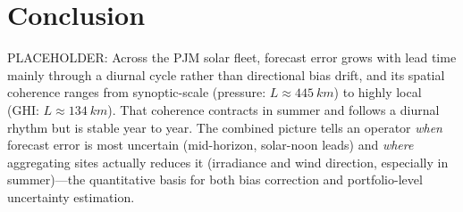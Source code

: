 \section{Conclusion}\label{sec:conclusion}

PLACEHOLDER: Across the PJM solar fleet, forecast error grows with lead time mainly through a diurnal cycle
rather than directional bias drift, and its spatial coherence ranges from synoptic-scale
(pressure: $L \approx \SI{445}{km}$) to highly local (GHI: $L \approx \SI{134}{km}$). That
coherence contracts in summer and follows a diurnal rhythm but is stable year to year. The
combined picture tells an operator \emph{when} forecast error is most uncertain (mid-horizon,
solar-noon leads) and \emph{where} aggregating sites actually reduces it (irradiance and wind
direction, especially in summer)---the quantitative basis for both bias correction and
portfolio-level uncertainty estimation.
